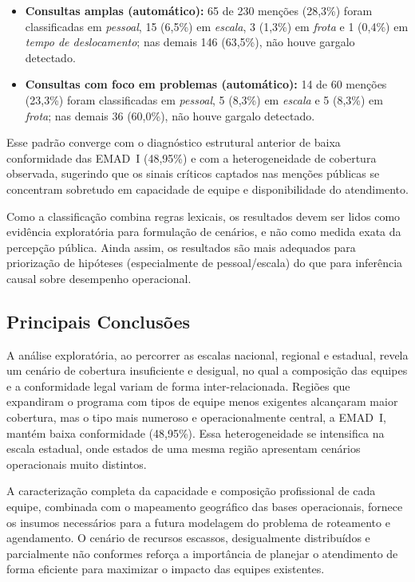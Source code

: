 \documentclass[12pt]{article}
\begin{document}
\begin{itemize}[leftmargin=1.2cm]
    \item \textbf{Consultas amplas (automático):} 65 de 230 menções (28,3\%) foram classificadas em \textit{pessoal}, 15 (6,5\%) em \textit{escala}, 3 (1,3\%) em \textit{frota} e 1 (0,4\%) em \textit{tempo de deslocamento}; nas demais 146 (63,5\%), não houve gargalo detectado.
    \item \textbf{Consultas com foco em problemas (automático):} 14 de 60 menções (23,3\%) foram classificadas em \textit{pessoal}, 5 (8,3\%) em \textit{escala} e 5 (8,3\%) em \textit{frota}; nas demais 36 (60,0\%), não houve gargalo detectado.
\end{itemize}

Esse padrão converge com o diagnóstico estrutural anterior de baixa conformidade das EMAD~I (48,95\%) e com a heterogeneidade de cobertura observada, sugerindo que os sinais críticos captados nas menções públicas se concentram sobretudo em capacidade de equipe e disponibilidade do atendimento.

Como a classificação combina regras lexicais, os resultados devem ser lidos como evidência exploratória para formulação de cenários, e não como medida exata da percepção pública. Ainda assim, os resultados são mais adequados para priorização de hipóteses (especialmente de pessoal/escala) do que para inferência causal sobre desempenho operacional.


\subsection{Principais Conclusões}

A análise exploratória, ao percorrer as escalas nacional, regional e estadual, revela um cenário de cobertura insuficiente e desigual, no qual a composição das equipes e a conformidade legal variam de forma inter-relacionada. Regiões que expandiram o programa com tipos de equipe menos exigentes alcançaram maior cobertura, mas o tipo mais numeroso e operacionalmente central, a EMAD~I, mantém baixa conformidade (48,95\%). Essa heterogeneidade se intensifica na escala estadual, onde estados de uma mesma região apresentam cenários operacionais muito distintos.

A caracterização completa da capacidade e composição profissional de cada equipe, combinada com o mapeamento geográfico das bases operacionais, fornece os insumos necessários para a futura modelagem do problema de roteamento e agendamento. O cenário de recursos escassos, desigualmente distribuídos e parcialmente não conformes reforça a importância de planejar o atendimento de forma eficiente para maximizar o impacto das equipes existentes.
\end{document}
